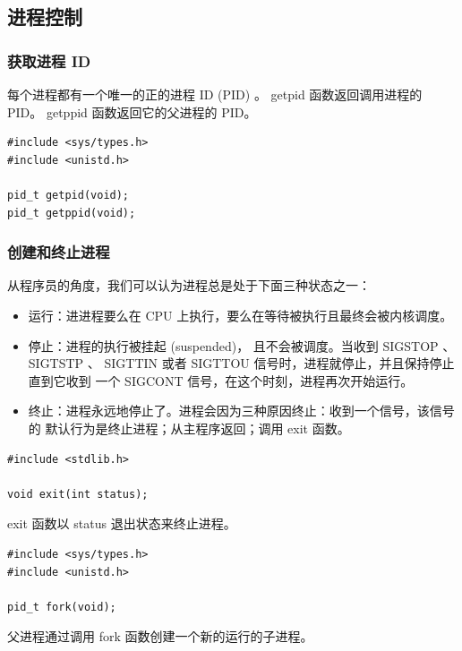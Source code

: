 \subsection{进程控制}

\subsubsection{获取进程 ID}

每个进程都有一个唯一的正的进程 ID (PID) 。 getpid 函数返回调用进程的 PID。
getppid 函数返回它的父进程的 PID。

\begin{lstlisting}[style=CStyle]
#include <sys/types.h>
#include <unistd.h>

pid_t getpid(void);
pid_t getppid(void);
\end{lstlisting}

\subsubsection{创建和终止进程}

从程序员的角度，我们可以认为进程总是处于下面三种状态之一：

\begin{itemize}
    \item 运行：进进程要么在 CPU 上执行，要么在等待被执行且最终会被内核调度。
    \item 停止：进程的执行被挂起 (suspended)， 且不会被调度。当收到 SIGSTOP 、 SIGTSTP 、 SIGTTIN 或者 SIGTTOU 信号时，进程就停止，并且保持停止直到它收到
          一个 SIGCONT 信号，在这个时刻，进程再次开始运行。
    \item 终止：进程永远地停止了。进程会因为三种原因终止：收到一个信号，该信号的
          默认行为是终止进程；从主程序返回；调用 exit 函数。
\end{itemize}

\begin{lstlisting}[style=CStyle]
#include <stdlib.h>

void exit(int status);
\end{lstlisting}

exit 函数以 status 退出状态来终止进程。

\begin{lstlisting}[style=CStyle]
#include <sys/types.h>
#include <unistd.h>

pid_t fork(void);
\end{lstlisting}

父进程通过调用 fork 函数创建一个新的运行的子进程。

